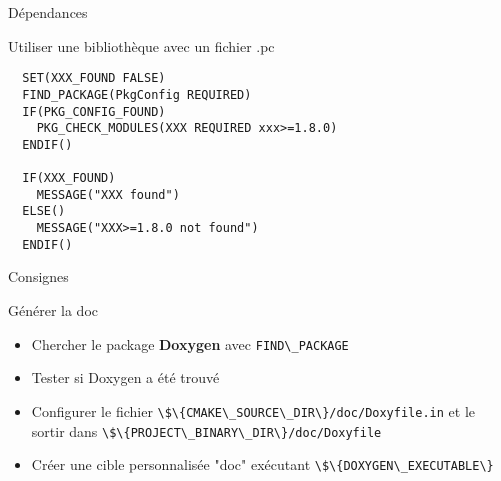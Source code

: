 \documentclass{beamer}
\begin{document}

\begin{frame}[fragile]{Dépendances}
  \begin{block}{Utiliser une bibliothèque avec un fichier .pc}
\begin{verbatim}
  SET(XXX_FOUND FALSE)
  FIND_PACKAGE(PkgConfig REQUIRED)
  IF(PKG_CONFIG_FOUND)
    PKG_CHECK_MODULES(XXX REQUIRED xxx>=1.8.0)
  ENDIF()

  IF(XXX_FOUND)
    MESSAGE("XXX found")
  ELSE()
    MESSAGE("XXX>=1.8.0 not found")
  ENDIF()
\end{verbatim}
  \end{block}
\end{frame}


\begin{frame}{Consignes}
  \begin{exampleblock}{Générer la doc}
    \begin{itemize}
    \item Chercher le package \textbf{Doxygen} avec \verb?FIND\_PACKAGE ?
    \item Tester si Doxygen a été trouvé
    \item Configurer le fichier \verb?\$\{CMAKE\_SOURCE\_DIR\}/doc/Doxyfile.in? et le sortir dans \verb?\$\{PROJECT\_BINARY\_DIR\}/doc/Doxyfile?
    \item Créer une cible personnalisée "doc" exécutant \verb?\$\{DOXYGEN\_EXECUTABLE\}?
    \end{itemize}
  \end{exampleblock}
\end{frame}

\end{document}
